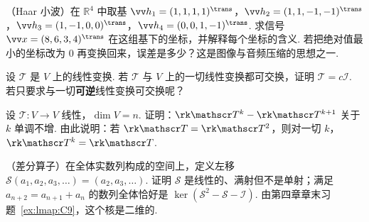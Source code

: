 {\begin{exC}
			\item\label{ex:lmap:C14} （Haar 小波）在 $\mathbb{R}^4$ 中取基 $\vv h_1=(1,1,1,1)^\trans$，$\vv h_2=(1,1,-1,-1)^\trans$，$\vv h_3=(1,-1,0,0)^\trans$，$\vv h_4=(0,0,1,-1)^\trans$. 求信号 $\vv x=(8,6,3,4)^\trans$ 在这组基下的坐标，并解释每个坐标的含义. 若把绝对值最小的坐标改为 $0$ 再变换回来，误差是多少？这是图像与音频压缩的思想之一.
			\item\label{ex:lmap:C15} 设 $\mathscr T$ 是 $V$ 上的线性变换. 若 $\mathscr T$ 与 $V$ 上的一切线性变换都可交换，证明 $\mathscr T=c\mathscr I$. 若只要求与一切\textbf{可逆}线性变换可交换呢？
			\item\label{ex:lmap:C16} 设 $\mathscr T:V\to V$ 线性，$\dim V=n$. 证明：$\rk\mathscr T^k-\rk\mathscr T^{k+1}$ 关于 $k$ 单调不增. 由此说明：若 $\rk\mathscr T=\rk\mathscr T^2$，则对一切 $k$，$\rk\mathscr T^k=\rk\mathscr T$.
			\item\label{ex:lmap:C17} （差分算子）在全体实数列构成的空间上，定义左移 $\mathscr S(a_1,a_2,a_3,\ldots)=(a_2,a_3,\ldots)$. 证明 $\mathscr S$ 是线性的、满射但不是单射；满足 $a_{n+2}=a_{n+1}+a_n$ 的数列全体恰好是 $\ker(\mathscr S^2-\mathscr S-\mathscr I)$. 由第四章章末习题~\ref{ex:lmap:C9}，这个核是二维的.
		\end{exC}

	}
	
